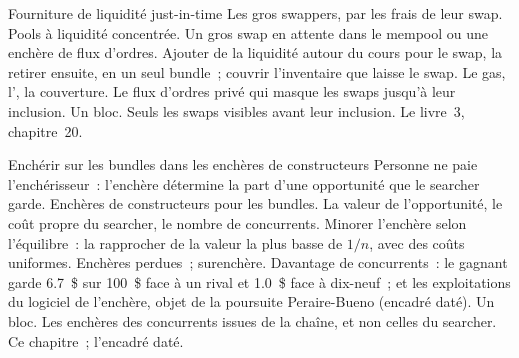 \begin{strategyfile}{Fourniture de liquidité just-in-time}\label{strat:hf:on-chain-trading:jit}
 Les gros swappers, par les frais de leur swap.
 Pools à liquidité concentrée.
 Un gros swap en attente dans le mempool ou une enchère de flux d'ordres.
 Ajouter de la liquidité autour du cours pour le swap, la retirer ensuite, en un seul bundle~; couvrir l'inventaire que laisse le swap.
 Le gas, l', la couverture.
 Le flux d'ordres privé qui masque les swaps jusqu'à leur inclusion.
 Un bloc.
 Seuls les swaps visibles avant leur inclusion.
 Le livre~3, chapitre~20.
\end{strategyfile}

\begin{strategyfile}{Enchérir sur les bundles dans les enchères de constructeurs}\label{strat:hf:on-chain-trading:bidding}
 Personne ne paie l'enchérisseur~: l'enchère détermine la part d'une opportunité que le searcher garde.
 Enchères de constructeurs pour les bundles.
 La valeur de l'opportunité, le coût propre du searcher, le nombre de concurrents.
 Minorer l'enchère selon l'équilibre~: la rapprocher de la valeur la plus basse de $1/n$, avec des coûts uniformes.
 Enchères perdues~; surenchère.
 Davantage de concurrents~: le gagnant garde 6.7~\$ sur 100~\$ face à un rival et 1.0~\$ face à dix-neuf~; et les exploitations du logiciel
de l'enchère, objet de la poursuite Peraire-Bueno (encadré daté).
 Un bloc.
 Les enchères des concurrents issues de la chaîne, et non celles du searcher.
 Ce chapitre~; l'encadré daté.
\end{strategyfile}


